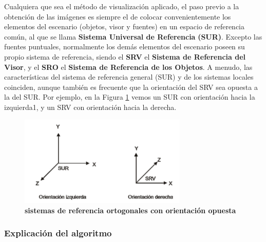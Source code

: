 Cualquiera que sea el método de visualización aplicado, el paso previo a la obtención de las imágenes es siempre el de colocar convenientemente los elementos del escenario (objetos, visor y fuentes) en un espacio de referencia
común, al que se llama \textbf{Sistema Universal de Referencia} \textbf{(SUR)}. Excepto las fuentes puntuales, normalmente los demás elementos del escenario poseen su propio sistema de referencia, siendo el \textbf{SRV} el \textbf{Sistema de Referencia del Visor}, y el \textbf{SRO} el \textbf{Sistema de Referencia de los Objetos}.
A menudo, las características del sistema de referencia general (SUR) y de los sistemas locales coinciden, aunque también es frecuente que la orientación del SRV sea opuesta a la del SUR. Por ejemplo, en la Figura \ref{fig:grafica8} vemos un SUR con orientación hacia la izquierda1, y un SRV con orientación hacia la derecha.

 \begin{figure}[h]
    \includegraphics[width=8cm]{Img/CPD/grafica8.jpg}
    \centering
    \caption{\textbf{\footnotesize{ sistemas de referencia ortogonales con orientación opuesta }}}
    \label{fig:grafica8}
    \end{figure}
    

    
\subsubsection{Explicación del algoritmo}

